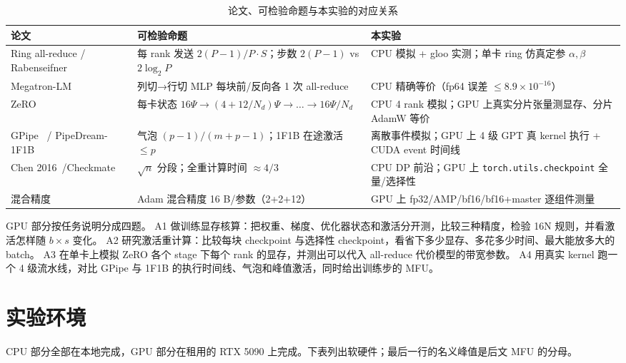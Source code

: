 \documentclass[11pt,a4paper]{ctexart}
\begin{document}
\begin{table}[H]\centering\small
\caption{论文、可检验命题与本实验的对应关系}
\begin{tabularx}{\linewidth}{>{\raggedright\arraybackslash}p{3.2cm}>{\raggedright\arraybackslash}X>{\raggedright\arraybackslash}X}
\toprule
论文 & 可检验命题 & 本实验 \\
\midrule
Ring all-reduce / Rabenseifner~\cite{thakur2005,patarasuk2009} & 每 rank 发送 $2(P-1)/P\cdot S$；步数 $2(P-1)$ vs $2\log_2 P$ & CPU 模拟 + gloo 实测；单卡 ring 仿真定参 $\alpha,\beta$ \\
Megatron-LM~\cite{shoeybi2019} & 列切→行切 MLP 每块前/反向各 1 次 all-reduce & CPU 精确等价（fp64 误差 $\le 8.9\times10^{-16}$） \\
ZeRO~\cite{rajbhandari2020} & 每卡状态 $16\Psi \to (4+12/N_d)\Psi \to \dots \to 16\Psi/N_d$ & CPU 4 rank 模拟；GPU 上真实分片张量测显存、分片 AdamW 等价 \\
GPipe~\cite{huang2019} / PipeDream-1F1B~\cite{narayanan2019,narayanan2021} & 气泡 $(p-1)/(m+p-1)$；1F1B 在途激活 $\le p$ & 离散事件模拟；GPU 上 4 级 GPT 真 kernel 执行 + CUDA event 时间线 \\
Chen 2016~\cite{chen2016}/Checkmate~\cite{jain2020} & $\sqrt{n}$ 分段；全重计算时间 $\approx 4/3$ & CPU DP 前沿；GPU 上 \texttt{torch.utils.checkpoint} 全量/选择性 \\
混合精度~\cite{micikevicius2018} & Adam 混合精度 16 B/参数（2+2+12） & GPU 上 fp32/AMP/bf16/bf16+master 逐组件测量 \\
\bottomrule
\end{tabularx}
\end{table}

GPU 部分按任务说明分成四题。
A1 做训练显存核算：把权重、梯度、优化器状态和激活分开测，比较三种精度，检验 16N 规则，并看激活怎样随 $b\times s$ 变化。
A2 研究激活重计算：比较每块 checkpoint 与选择性 checkpoint，看省下多少显存、多花多少时间、最大能放多大的 batch。
A3 在单卡上模拟 ZeRO 各个 stage 下每个 rank 的显存，并测出可以代入 all-reduce 代价模型的带宽参数。
A4 用真实 kernel 跑一个 4 级流水线，对比 GPipe 与 1F1B 的执行时间线、气泡和峰值激活，同时给出训练步的 MFU。

\section{实验环境}
CPU 部分全部在本地完成，GPU 部分在租用的 RTX 5090 上完成。下表列出软硬件；最后一行的名义峰值是后文 MFU 的分母。
\end{document}
